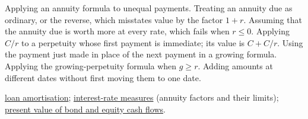 \begin{qfmethod}
 Applying an annuity formula to unequal payments. Treating an annuity due as ordinary, or the reverse, which misstates value by the factor $1+r$. Assuming that the annuity due is worth more at every rate, which fails when $r\le0$. Applying $C/r$ to a perpetuity whose first payment is immediate; its value is $C+C/r$. Using the payment just made in place of the next payment in a growing formula. Applying the growing-perpetuity formula when $g\ge r$. Adding amounts at different dates without first moving them to one date.

 \hyperref[meth:loan-amortisation]{loan amortisation}; \hyperref[def:interest-rate-measures]{interest-rate measures} (annuity factors and their limits); \hyperref[meth:instrument-present-value]{present value of bond and equity cash flows}.

\end{qfmethod}

